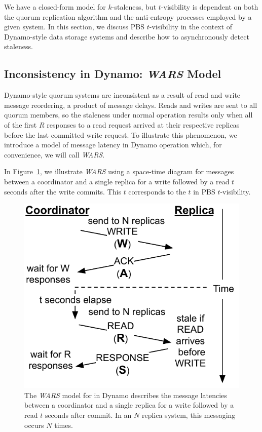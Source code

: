 \documentclass{vldb}
\newcommand{\subsectionskip}{-0em}
\begin{document}
We have a closed-form model for $k$-staleness, but
$t$-visibility is dependent on both the quorum replication algorithm
and the anti-entropy processes employed by a given system.  In this
section, we discuss PBS $t$-visibility in the context of Dynamo-style
data storage systems and describe how to asynchronously detect
staleness.

\vspace{\subsectionskip}\subsection{Inconsistency in Dynamo: {\large \textit{WARS}} Model}
\label{sec:wars}

Dynamo-style quorum systems are inconsistent as a result of read and
write message reordering, a product of message delays.  Reads and
writes are sent to all quorum members, so the staleness under normal
operation results only when all of the first $R$ responses to a read
request arrived at their respective replicas before the last committed
write request.  To illustrate this phenomenon, we introduce a model
of message latency in Dynamo operation which, for convenience, we will
call \textit{WARS}.

In Figure~\ref{fig:dynamo-diagram}, we illustrate \textit{WARS} using
a space-time diagram for messages between a coordinator and a single
replica for a write followed by a read $t$ seconds after the write
commits.  This $t$ corresponds to the $t$ in PBS $t$-visibility.

\begin{figure}
\centering
\includegraphics[width=.8\columnwidth]{figs/dynamostale.pdf}
\vspace{-8pt}
\caption{The \textit{WARS} model for in Dynamo describes the message
  latencies between a coordinator and a single replica for a write
  followed by a read $t$ seconds after commit.  In an $N$ replica
  system, this messaging occurs $N$ times.}
\vspace{-12pt}
\label{fig:dynamo-diagram}
\end{figure}
\end{document}
